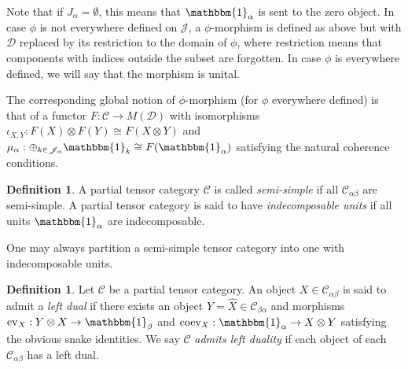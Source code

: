 \documentclass[10pt]{article}
\newcommand{\CatC}{\mathcal{C}}
\newcommand{\CatD}{\mathcal{D}}
\newcommand{\CatCC}{\mathscr{C}}
\newcommand{\CatDD}{\mathscr{D}}
\newcommand{\ev}{\mathrm{ev}}
\newcommand{\coev}{\mathrm{coev}}
\newcommand{\Unitb}{\mathbbm{1}}
\theoremstyle{definition}
\newtheorem{Def}[Theorem]{Definition}
\numberwithin{equation}{section}
\begin{document}
Note that if $J_{\alpha}=\emptyset$, this means that $\Unitb_{\alpha}$ is sent to the zero object. In case $\phi$ is not everywhere defined on $\mathscr{J}$, a $\phi$-morphism is defined as above but with $\CatDD$ replaced by its restriction to the domain of $\phi$, where restriction means that components with indices outside the subset are forgotten. In case $\phi$ is everywhere defined, we will say that the morphism is unital.

The corresponding global notion of $\phi$-morphism (for $\phi$ everywhere defined) is that of a functor $F:\CatC \rightarrow M(\CatD)$ with isomorphisms $\iota_{X,Y}:F(X)\otimes F(Y)\cong F(X\otimes Y)$ and $\mu_\alpha:\oplus_{k\in \mathscr{J}_\alpha} \Unitb_k \cong F(\Unitb_\alpha)$ satisfying the natural coherence conditions. 




\begin{Def} A partial tensor category $\CatCC$ is called \emph{semi-simple} if all $\CatC_{\alpha\beta}$ are semi-simple. A partial tensor category is said to have \emph{indecomposable units} if all units $\Unitb_\alpha$ are indecomposable. 
\end{Def}

One may always partition a semi-simple tensor category into one with indecomposable units.

 

\begin{Def} Let $\CatCC$ be a partial tensor category. An object $X\in \CatC_{\alpha\beta}$ is said to admit a \emph{left dual} if there exists an object $Y=\hat{X} \in \CatC_{\beta\alpha}$ and morphisms $\ev_{X}: Y\otimes X \rightarrow \Unitb_\beta$ and $\coev_X: \Unitb_\alpha\rightarrow X\otimes Y$ satisfying the obvious snake identities. We say $\CatCC$ \emph{admits left duality} if each object of each $\CatC_{\alpha\beta}$ has a left dual.
\end{Def}
\end{document}

